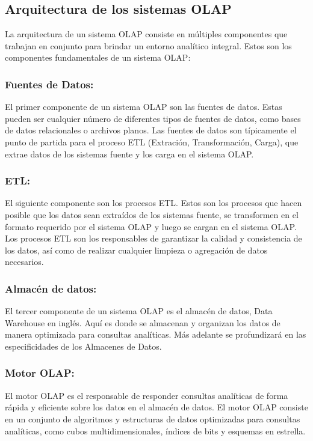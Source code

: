 \subsection{Arquitectura de los sistemas OLAP}

La arquitectura de un sistema OLAP consiste en múltiples componentes que trabajan en conjunto para brindar un entorno 
analítico integral. Estos son los componentes fundamentales de un sistema OLAP:

\subsubsection{Fuentes de Datos:}
El primer componente de un sistema OLAP son las fuentes de datos. Estas pueden ser cualquier número de diferentes 
tipos de fuentes de datos, como bases de datos relacionales o archivos planos. Las fuentes de 
datos son típicamente el punto de partida para el proceso ETL (Extraci\'on, Transformaci\'on, Carga), que extrae datos 
de los sistemas fuente y los carga en el sistema OLAP.

\subsubsection{ETL:}
El siguiente componente son los procesos ETL. Estos son los procesos que hacen posible 
que los datos sean extra\'idos de los sistemas fuente, se transformen en el formato requerido por el sistema OLAP y luego se 
cargan en el sistema OLAP. Los procesos ETL son los responsables de garantizar la calidad y consistencia de los datos, 
así como de realizar cualquier limpieza o agregación de datos necesarios.

\subsubsection{Almacén de datos:}
El tercer componente de un sistema OLAP es el almacén de datos, Data Warehouse en ingl\'es. Aquí es donde se almacenan y 
organizan los datos de manera optimizada para consultas analíticas. M\'as adelante se profundizar\'a en las especificidades 
de los Almacenes de Datos.

\subsubsection{Motor OLAP:}
El motor OLAP es el responsable de responder consultas analíticas de forma rápida y eficiente sobre 
los datos en el almacén de datos. El motor OLAP consiste en un conjunto de algoritmos y estructuras de datos 
optimizadas para consultas analíticas, como cubos multidimensionales, índices de bits y esquemas en estrella.

